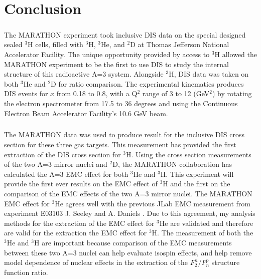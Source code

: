 
\chapter{Conclusion}
\paragraph{}The MARATHON experiment took inclusive DIS data on the special designed sealed $^3$H cells, filled with $^3$H, $^3$He, and $^2$D at Thomas Jefferson National Accelerator Facility. The unique opportunity provided by access to $^3$H allowed the MARATHON experiment to be the first to use DIS to study the internal structure of this radioactive A=3 system. Alongside $^3$H, DIS data was taken on both $^3$He and $^2$D for ratio comparison. The experimental kinematics produces DIS events for $x$ from 0.18 to 0.8, with a Q$^2$ range of 3 to 12 (GeV$^2$) by rotating the electron spectrometer from 17.5 to 36 degrees and using the Continuous Electron Beam Accelerator Facility's 10.6 GeV beam. 
\paragraph{}The MARATHON data was used to produce result for the inclusive DIS cross section for these three gas targets. This measurement has provided the first extraction of the DIS cross section for $^3$H. Using the cross section measurements of the two A=3 mirror nuclei and $^2$D, the MARATHON collaboration has calculated the A=3 EMC effect for both $^3$He and $^3$H. This experiment will provide the first ever results on the EMC effect of $^3$H and the first on the comparison of the EMC effects of the two A=3 mirror nuclei. The MARATHON EMC effect for $^3$He agrees well with the previous JLab EMC measurement from experiment E03103 J. Seeley and A. Daniels \cite{seeley}. Due to this agreement, my analysis methods for the extraction of the EMC effect for $^3$He are validated and therefore are valid for the extraction the EMC effect for $^3$H. The measurement of both the $^3$He and $^3$H are important because comparison of the EMC measurements between these two A=3 nuclei can help evaluate isospin effects, and help remove model dependence of nuclear effects in the extraction of the $F^n_2/F^p_n$ structure function ratio. 

